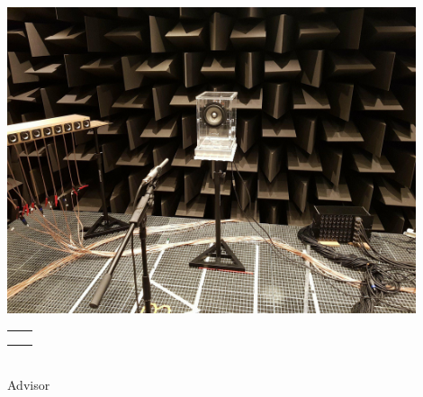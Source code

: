 
\settowidth{\unitlength}{\titleMain}

\begin{titlingpage}
\centering

{
	\color{LightGoldenrod}
	\resizebox*{\unitlength}{\baselineskip}{\rotateright{$\}$}}
} \\ [\baselineskip]

{
	\color{Sienna}
	\titleMain
} \\ [\baselineskip]


{
	\color{RosyBrown}
	\titleSemester \\
}

{
	\color{LightGoldenrod}
	\resizebox*{\unitlength}{\baselineskip}{\rotateleft{$\}$}}
}

\vfill

\includegraphics[width=12cm]{gfx/meas_setup.jpg}

\vfill

\begin{tabu} to \linewidth {X[1,c] X[1,c]}
\authorOneName						& \authorTwoName \\
\authorOneID						& \authorTwoID \\
									& \\
\end{tabu} \\ [2\baselineskip]

{
	{\Large Advisor} \\
	\advisorName
}

\end{titlingpage}
